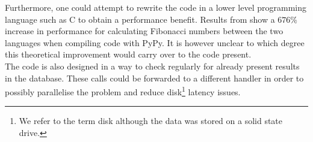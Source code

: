 \begin{appendix}
\begin{section}
Furthermore, one could attempt to rewrite the code in a lower level programming language such as C to obtain a performance benefit.
Results from \cite{jensenDrujensenFib2021} show a $676\%$ increase in performance for calculating Fibonacci numbers between the two languages when compiling code with PyPy.
It is however unclear to which degree this theoretical improvement would carry over to the code present.\\
The code is also designed in a way to check regularly for already present results in the database.
These calls could be forwarded to a different handler in order to possibly parallelise the problem and reduce disk\footnote{We refer to the term disk although the data was stored on a solid state drive.} latency issues.
\end{section}
\end{appendix}